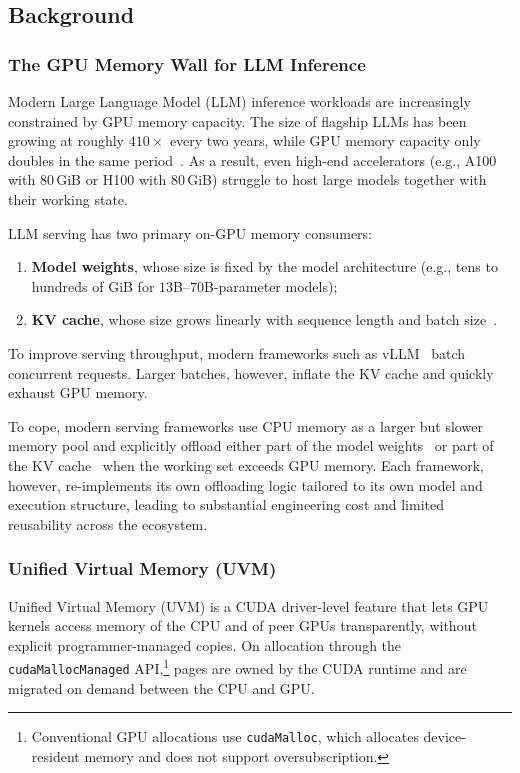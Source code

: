 \subsection{Background}
\label{uvm:sec:background}

\subsubsection{The GPU Memory Wall for LLM Inference}
\label{uvm:sec:bg:memwall}

Modern Large Language Model (LLM) inference workloads are increasingly
    constrained by GPU memory capacity.
The size of flagship LLMs has been growing
    at roughly $410\times$ every two years,
    while GPU memory capacity only doubles
    in the same period~\cite{ai-memory-wall}.
As a result, even high-end accelerators
    (e.g., A100 with $80$\,GiB or H100 with $80$\,GiB)
    struggle to host large models together with their working state.

LLM serving has two primary on-GPU memory consumers:
\begin{enumerate}
\item \textbf{Model weights}, whose size is fixed by the model architecture
    (e.g., tens to hundreds of GiB for $13$B--$70$B-parameter models);
\item \textbf{KV cache}, whose size grows linearly
    with sequence length and batch size~\cite{vllm}.
\end{enumerate}
To improve serving throughput,
    modern frameworks such as vLLM~\cite{vllm} batch concurrent requests.
Larger batches, however, inflate the KV cache
    and quickly exhaust GPU memory.

To cope, modern serving frameworks use CPU memory
    as a larger but slower memory pool
    and explicitly offload either part of the model weights~\cite{flexgen, vllm, infinigen}
    or part of the KV cache~\cite{flexgen, headinfer, hf-offload}
    when the working set exceeds GPU memory.
Each framework, however, re-implements its own offloading logic
    tailored to its own model and execution structure,
    leading to substantial engineering cost
    and limited reusability across the ecosystem.

\subsubsection{Unified Virtual Memory (UVM)}
\label{uvm:sec:bg:uvm}

Unified Virtual Memory (UVM) is a CUDA driver-level feature
    that lets GPU kernels access memory of the CPU and of peer GPUs
    transparently, without explicit programmer-managed copies.
On allocation through the \texttt{cudaMallocManaged} API,\footnote{Conventional GPU allocations use \texttt{cudaMalloc}, which allocates device-resident memory and does not support oversubscription.}
    pages are owned by the CUDA runtime
    and are migrated on demand between the CPU and GPU.

